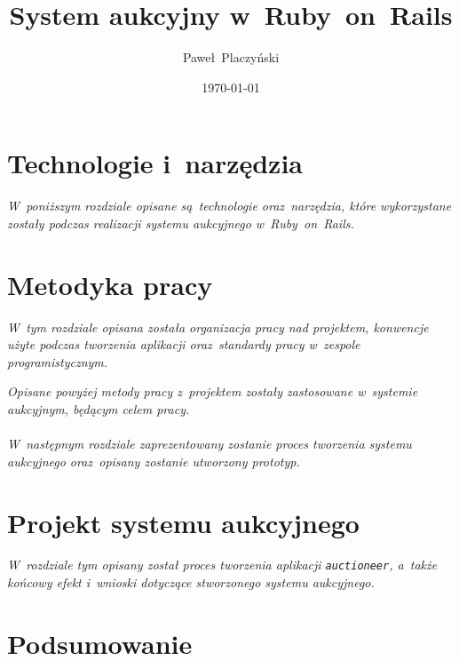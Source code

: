 \documentclass[11pt,oneside]{book}
\author{Paweł~Placzyński}
\title{System aukcyjny w~Ruby~on~Rails}
\date{\today}
\begin{document}


\tableofcontents



\chapter{Technologie i~narzędzia}

\textit{W~poniższym rozdziale opisane są~technologie oraz~narzędzia, które wykorzystane zostały podczas realizacji systemu aukcyjnego w~Ruby~on~Rails.}





\chapter{Metodyka pracy}

\textit{W~tym rozdziale opisana została organizacja pracy nad projektem, konwencje użyte podczas tworzenia aplikacji oraz~standardy pracy w~zespole programistycznym.}





\textit{Opisane powyżej metody pracy z~projektem zostały zastosowane w~systemie aukcyjnym, będącym celem pracy.\\\\W~następnym rozdziale zaprezentowany zostanie proces tworzenia systemu aukcyjnego oraz~opisany zostanie utworzony prototyp.}

\chapter{Projekt systemu aukcyjnego}

\textit{W~rozdziale tym opisany został proces tworzenia aplikacji \texttt{auctioneer}, a~także końcowy efekt i~wnioski dotyczące stworzonego systemu aukcyjnego.}







\chapter{Podsumowanie}



\listoffigures
{}

\lstlistoflistings
{}


\end{document}
